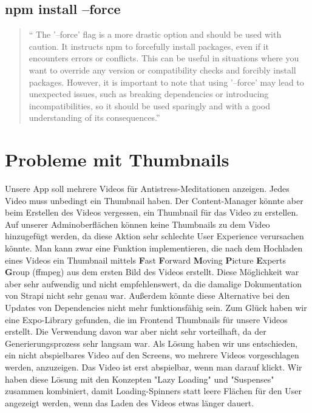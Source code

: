 \begin{spacing}{1}
    \subsection{npm install --force}\label{subsec:npm-install---force}
    \begin{quotation}
        ``
        The '--force'  flag is a more drastic option and should be used with caution.
        It instructs npm to forcefully install packages, even if it encounters errors or conflicts.
        This can be useful in situations where you want to override any version or compatibility checks
        and forcibly install packages.
        However, it is important to note that using '--force'
        may lead to unexpected issues, such as breaking dependencies or introducing incompatibilities,
        so it should be used sparingly and with a good understanding of its consequences.''
        ~\cite{installFlags}
    \end{quotation}



    \section{Probleme mit Thumbnails}\label{sec:probleme-mit-thumbnails}


    Unsere App soll mehrere Videos für Antistress-Meditationen anzeigen.
    Jedes Video muss unbedingt ein Thumbnail haben.
    Der Content-Manager könnte aber beim Erstellen des Videos vergessen,
    ein Thumbnail für das Video zu erstellen.
    Auf unserer Adminoberflächen können keine Thumbnails zu dem Video hinzugefügt werden,
    da diese Aktion sehr schlechte User Experience verursachen könnte.
    Man kann zwar eine Funktion implementieren,
    die nach dem Hochladen eines Videos ein Thumbnail mittels \textbf{F}ast \textbf{F}orward \textbf{M}oving
    \textbf{P}icture \textbf{E}xperts \textbf{G}roup (ffmpeg) aus dem ersten Bild des Videos erstellt.
    Diese Möglichkeit war aber sehr aufwendig und nicht empfehlenswert, da die damalige Dokumentation von
    Strapi nicht sehr genau war.
    Außerdem könnte diese Alternative bei den Updates von Dependencies nicht mehr funktionsfähig sein.
    Zum Glück haben wir eine Expo-Library gefunden, die im Frontend Thumbnails für unsere Videos erstellt.
    Die Verwendung davon war aber nicht sehr vorteilhaft, da der Generierungsprozess sehr langsam war.
    Als Lösung haben wir uns entschieden, ein nicht abspielbares Video auf den Screens, wo mehrere Videos vorgeschlagen werden,
    anzuzeigen.
    Das Video ist erst abspielbar, wenn man darauf klickt.
    Wir haben diese Lösung mit den Konzepten "Lazy Loading" und "Suspenses" zusammen kombiniert,
    damit Loading-Spinners statt leere Flächen für den User angezeigt werden,
    wenn das Laden des Videos etwas länger dauert.




\end{spacing}
